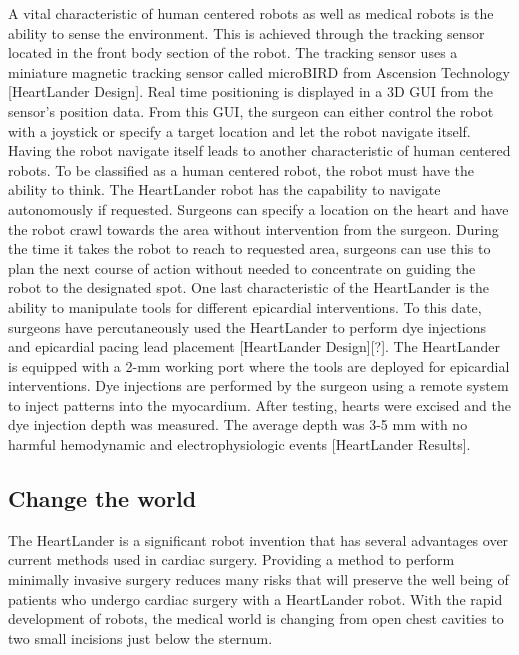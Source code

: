\documentclass[11pt,conference]{IEEEtran}
\begin{document}
\newline
\indent A vital characteristic of human centered robots as well as medical robots is the ability to sense the environment. This is achieved through the tracking sensor located in the front body section of the robot. The tracking sensor uses a miniature magnetic tracking sensor called microBIRD from Ascension Technology [HeartLander Design]. Real time positioning is displayed in a 3D GUI from the sensor's position data. From this GUI, the surgeon can either control the robot with a joystick or specify a target location and let the robot navigate itself. Having the robot navigate itself leads to another characteristic of human centered robots.
\newline
\indent To be classified as a human centered robot, the robot must have the ability to think. The HeartLander robot has the capability to navigate autonomously if requested. Surgeons can specify a location on the heart and have the robot crawl towards the area without intervention from the surgeon. During the time it takes the robot to reach to requested area, surgeons can use this to plan the next course of action without needed to concentrate on guiding the robot to the designated spot.
\newline
\indent One last characteristic of the HeartLander is the ability to manipulate tools for different epicardial interventions. To this date, surgeons have percutaneously used the HeartLander to perform dye injections and epicardial pacing lead placement [HeartLander Design][?]. The HeartLander is equipped with a 2-mm working port where the tools are deployed for epicardial interventions. Dye injections are performed by the surgeon using a remote system to inject patterns into the myocardium. After testing, hearts were excised and the dye injection depth was measured. The average depth was 3-5 mm with no harmful hemodynamic and electrophysiologic events [HeartLander Results].
\subsection { Change the world }
\indent The HeartLander is a significant robot invention that has several advantages over current methods used in cardiac surgery. Providing a method to perform minimally invasive surgery reduces many risks that will preserve the well being of patients who undergo cardiac surgery with a HeartLander robot. With the rapid development of robots, the medical world is changing from open chest cavities to two small incisions just below the sternum. 

\end{document}

